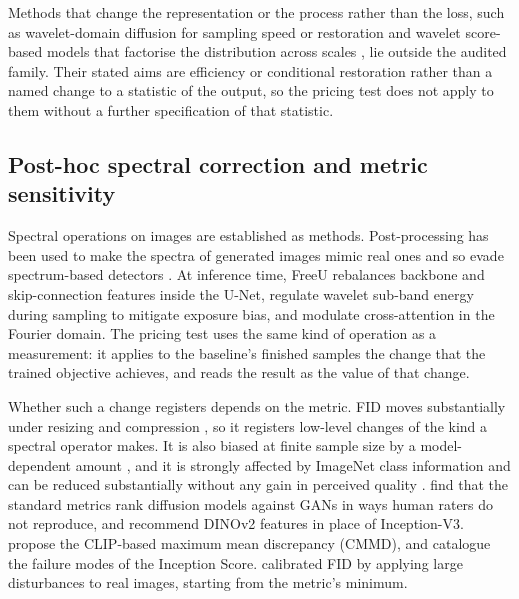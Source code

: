 Methods that change the representation or the process rather than the loss,
such as wavelet-domain diffusion for sampling speed \citep{phung2023wavelet}
or restoration \citep{huang2024wavedm} and wavelet score-based models that
factorise the distribution across scales \citep{guth2022wavelet}, lie outside
the audited family. Their stated aims are efficiency or conditional
restoration rather than a named change to a statistic of the output, so the
pricing test does not apply to them without a further specification of that
statistic.

\subsection{Post-hoc spectral correction and metric sensitivity}
\label{sec:related-metrics}

Spectral operations on images are established as methods. Post-processing has
been used to make the spectra of generated images mimic real ones and so evade
spectrum-based detectors \citep{dzanic2020fourier,dong2022think}. At inference
time, FreeU \citep{si2024freeu} rebalances backbone and skip-connection
features inside the U-Net, \citet{yu2025frequency} regulate wavelet sub-band
energy during sampling to mitigate exposure bias, and \citet{oh2026attention}
modulate cross-attention in the Fourier domain. The pricing test uses the same
kind of operation as a measurement: it applies to the baseline's finished
samples the change that the trained objective achieves, and reads the result
as the value of that change.

Whether such a change registers depends on the metric. FID moves substantially
under resizing and compression \citep{parmar2022aliased}, so it registers
low-level changes of the kind a spectral operator makes. It is also biased at
finite sample size by a model-dependent amount \citep{chong2020effectively},
and it is strongly affected by ImageNet class information and can be reduced
substantially without any gain in perceived quality
\citep{kynkaanniemi2023role}. \citet{stein2023exposing} find that the standard
metrics rank diffusion models against GANs in ways human raters do not
reproduce, and recommend DINOv2 features in place of Inception-V3.
\citet{jayasumana2024rethinking} propose the CLIP-based maximum mean
discrepancy (CMMD), and \citet{barratt2018note} catalogue the failure modes of
the Inception Score. \citet{heusel2017gans} calibrated FID by applying large
disturbances to real images, starting from the metric's minimum.

